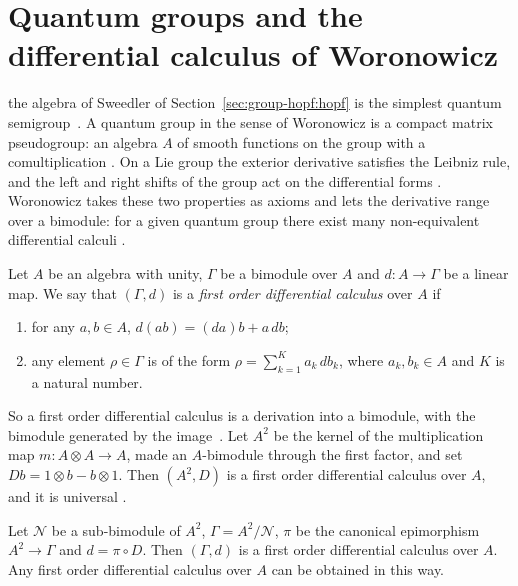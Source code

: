 \section{Quantum groups and the differential calculus of Woronowicz}\label{sec:group-hopf:quantum}

the algebra of Sweedler of Section~\ref{sec:group-hopf:hopf} is the simplest
quantum semigroup~\cite[p.~126]{Woronowicz1989}. A quantum group in the sense of Woronowicz is a compact
matrix pseudogroup: an algebra $A$ of smooth functions on the group with a
comultiplication \cite[p.~126]{Woronowicz1989}. On a Lie group the exterior
derivative satisfies the Leibniz rule, and the left and right shifts of the
group act on the differential forms \cite[pp.~126--127]{Woronowicz1989}.
Woronowicz takes these two properties as axioms and lets the derivative range
over a bimodule: for a given quantum group there exist many non-equivalent
differential calculi \cite[p.~126]{Woronowicz1989}.

\begin{definition}\label{def:group-hopf:fodc}
Let $A$ be an algebra with unity, $\Gamma$ be a bimodule over $A$ and
$d\colon A\to\Gamma$ be a linear map. We say that $(\Gamma,d)$ is a
\emph{first order differential calculus} over $A$ if
\begin{enumerate}
\item for any $a,b\in A$, $d(ab)=(da)b+a\,db$;
\item any element $\rho\in\Gamma$ is of the form $\rho=\sum_{k=1}^{K}a_k\,db_k$,
where $a_k,b_k\in A$ and $K$ is a natural number.
\end{enumerate}
\end{definition}

So a first order differential calculus is a derivation into a bimodule, with
the bimodule generated by the image~\cite[p.~128]{Woronowicz1989}. Let $A^2$ be the kernel of the
multiplication map $m\colon A\otimes A\to A$, made an $A$-bimodule through the
first factor, and set $Db=1\otimes b-b\otimes1$. Then $(A^2,D)$ is a first
order differential calculus over $A$, and it is universal
\cite[p.~128]{Woronowicz1989}.

\begin{proposition}\label{prop:group-hopf:universal}
Let $\mathcal{N}$ be a sub-bimodule of $A^2$, $\Gamma=A^2/\mathcal{N}$, $\pi$ be the
canonical epimorphism $A^2\to\Gamma$ and $d=\pi\circ D$. Then $(\Gamma,d)$ is a
first order differential calculus over $A$. Any first order differential calculus
over $A$ can be obtained in this way.
\end{proposition}

